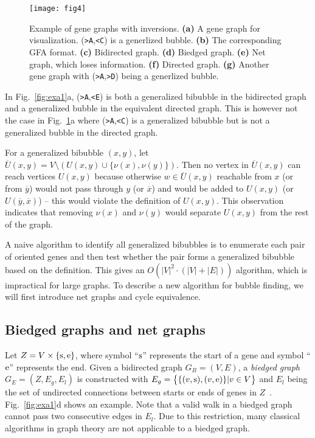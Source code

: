 \documentclass[webpdf,contemporary,large,namedate]{oup-authoring-template}%
\begin{document}
\begin{figure}[t!]
\centering
\texttt{[image: fig4]}
\caption{Example of gene graphs with inversions.
{\bf (a)} A gene graph for visualization. ({\tt >A},{\tt <C}) is a generlized bubble.
{\bf (b)} The corresponding GFA format.
{\bf (c)} Bidirected graph.
{\bf (d)} Biedged graph.
{\bf (e)} Net graph, which loses information.
{\bf (f)} Directed graph.
{\bf (g)} Another gene graph with ({\tt >A},{\tt >D}) being a generlized bubble.
}\label{fig:inv}
\end{figure}

In Fig.~\ref{fig:exa1}a, ({\tt >A},{\tt <E}) is both a generalized bibubble in the bidirected graph
and a generalized bubble in the equivalent directed graph.
This is however not the case in Fig.~\ref{fig:inv}a where
({\tt >A},{\tt <C}) is a generalized bibubble but is not a generalized bubble in the directed graph.

For a generalized bibubble $(x,y)$, let $\overline{U}(x,y)=V\setminus(U(x,y)\cup\{\nu(x),\nu(y)\})$.
Then no vertex in $\overline{U}(x,y)$ can reach vertices $U(x,y)$
because otherwise $w\in\overline{U}(x,y)$ reachable from $x$ (or from $\overline{y}$)
would not pass through $y$ (or $\overline{x}$) and would be added to $U(x,y)$ (or $U(\overline{y},\overline{x})$)
-- this would violate the definition of $U(x,y)$.
This observation indicates that removing $\nu(x)$ and $\nu(y)$ would separate $U(x,y)$ from the rest of the graph.

A naive algorithm to identify all generalized bibubbles is to enumerate each pair of oriented genes
and then test whether the pair forms a generalized bibubble based on the definition.
This gives an $O(|V|^2\cdot(|V|+|E|))$ algorithm, which is impractical for large graphs.
To describe a new algorithm for bubble finding, we will first introduce net graphs and cycle equivalence.

\subsection{Biedged graphs and net graphs}

Let $Z=V\times\{{\rm s},{\rm e}\}$, where symbol ``${\rm s}$'' represents the start of a gene
and symbol ``${\rm e}$'' represents the end.
Given a bidirected graph $G_B=(V,E)$, a \emph{biedged graph} $G_E=(Z,E_g,E_l)$ is constructed
with $E_g=\big\{\{(v,{\rm s}),(v,{\rm e})\}|v\in V\big\}$ and $E_l$ being the set of undirected connections between starts or ends of genes in $Z$~\citep{Paten:2018aa}.
Fig.~\ref{fig:exa1}d shows an example.
Note that a valid walk in a biedged graph cannot pass two consecutive edges in $E_l$.
Due to this restriction, many classical algorithms in graph theory are not applicable to a biedged graph.
\end{document}
